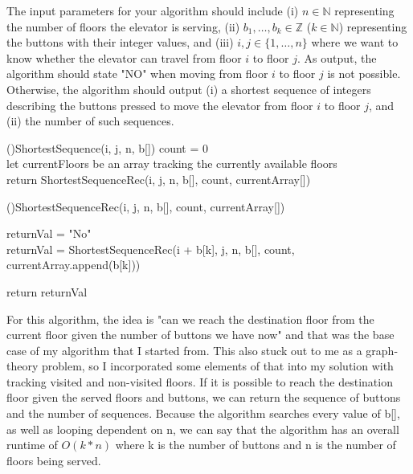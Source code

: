 \documentclass[11pt]{amsart}
\begin{document}
The input parameters for your algorithm should include (i) $n\in \mathbb{N}$ representing the number of floors the 
elevator is serving, (ii) $b_1,\ldots, b_k \in \mathbb{Z}$ ($k\in\mathbb{N}$) representing the buttons with their
integer values, and (iii) $i,j \in \{1,\ldots , n\}$ where we want to know whether the elevator can travel from floor $i$ to floor $j$.
As output, the algorithm should state "NO" when moving from floor $i$ to floor $j$ is not possible. Otherwise, the 
algorithm should output (i) a shortest sequence of integers describing the buttons pressed to move the elevator from floor
$i$ to floor $j$, and (ii) the number of such sequences.

\newpage

\begin{algorithm}[H]
    \Fn(){ShortestSequence(i, j, n, b[])}{
    \SetAlgoLined
    \SetNoFillComment
    \DontPrintSemicolon
        count = 0 \\
        let currentFloors be an array tracking the currently available floors \\
        return ShortestSequenceRec(i, j, n, b[], count, currentArray[])
    }
    \end{algorithm}

    \begin{algorithm}[H]
        \Fn(){ShortestSequenceRec(i, j, n, b[], count, currentArray[])}{
        \SetAlgoLined
        \SetNoFillComment
        \DontPrintSemicolon
            returnVal = "No" \\
             {
                returnVal = ShortestSequenceRec(i + b[k], j, n, b[], count, currentArray.append(b[k]))
            }

            return returnVal
        }
        \end{algorithm}
\bigskip

\hspace*{15mm}For this algorithm, the idea is "can we reach the destination floor from the current floor given the number of buttons we have now" and that was the base case of my algorithm that I started from. This also stuck out to me as a graph-theory problem, so I incorporated some elements of that into my solution with tracking visited and non-visited floors. If it is possible to reach the destination floor given the served floors and buttons, we can return the sequence of buttons and the number of sequences. Because the algorithm searches every value of b[], as well as looping dependent on n, we can say that the algorithm has an overall runtime of $O(k * n)$ where k is the number of buttons and n is the number of floors being served.
\newpage
\end{document}
